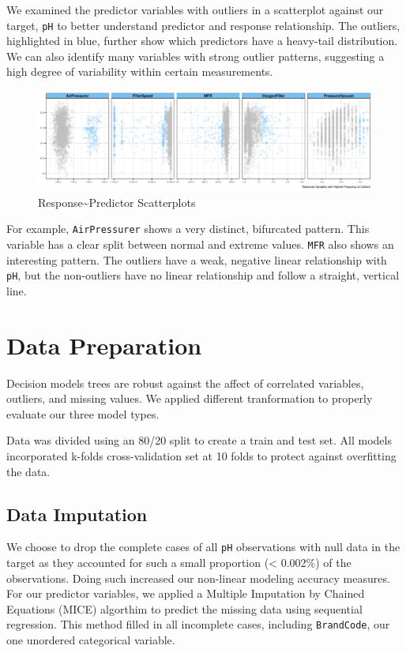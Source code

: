 \documentclass[]{report}
\begin{document}
We examined the predictor variables with outliers in a scatterplot
against our target, \texttt{pH} to better understand predictor and
response relationship. The outliers, highlighted in blue, further show
which predictors have a heavy-tail distribution. We can also identify
many variables with strong outlier patterns, suggesting a high degree of
variability within certain measurements.

\begin{figure}
\centering
\includegraphics{Proj2-JM_files/figure-latex/unnamed-chunk-4-1.pdf}
\caption{Response\textasciitilde{}Predictor Scatterplots}
\end{figure}

For example, \texttt{AirPressurer} shows a very distinct, bifurcated
pattern. This variable has a clear split between normal and extreme
values. \texttt{MFR} also shows an interesting pattern. The outliers
have a weak, negative linear relationship with \texttt{pH}, but the
non-outliers have no linear relationship and follow a straight, vertical
line.

\hypertarget{data-preparation}{%
\chapter{Data Preparation}\label{data-preparation}}

Decision models trees are robust against the affect of correlated
variables, outliers, and missing values. We applied different
tranformation to properly evaluate our three model types.

Data was divided using an 80/20 split to create a train and test set.
All models incorporated k-folds cross-validation set at 10 folds to
protect against overfitting the data.

\hypertarget{data-imputation}{%
\section{Data Imputation}\label{data-imputation}}

We choose to drop the complete cases of all \texttt{pH} observations
with null data in the target as they accounted for such a small
proportion (\textless{} 0.002\%) of the observations. Doing such
increased our non-linear modeling accuracy measures. For our predictor
variables, we applied a Multiple Imputation by Chained Equations (MICE)
algorthim to predict the missing data using sequential regression. This
method filled in all incomplete cases, including \texttt{BrandCode}, our
one unordered categorical variable.
\end{document}
